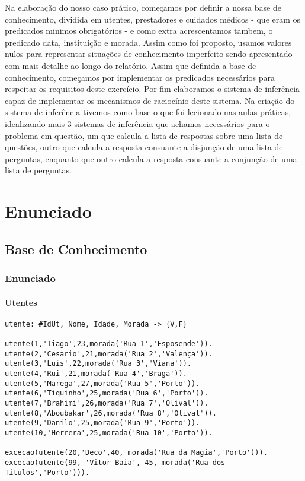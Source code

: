 \documentclass{report}
\begin{document}
Na elaboração do nosso caso prático, começamos por definir a nossa base de conhecimento, dividida em utentes, prestadores e cuidados médicos - que eram os predicados minimos obrigatórios - e como extra acrescentamos tambem, o predicado data, instituição e morada. Assim como foi proposto, usamos valores nulos para representar situações de conhecimento imperfeito sendo apresentado com mais detalhe ao longo do relatório. Assim que definida a base de conhecimento, começamos por implementar os predicados necessários para respeitar os requisitos deste exercício. Por fim elaboramos o sistema de inferência capaz de implementar os mecanismos de raciocínio deste sistema. Na criação do sistema de inferência tivemos como base o que foi lecionado nas aulas práticas, idealizando mais 3 sistemas de inferência que achamos necessários para o problema em questão, um que calcula a lista de respostas sobre uma lista de questões, outro que calcula a resposta consuante a disjunção de uma lista de perguntas, enquanto que outro calcula a resposta consuante a conjunção de uma lista de perguntas.
























\chapter{Enunciado}








\section{Base de Conhecimento}
\subsection{Enunciado}
\subsubsection{Utentes}
\begin{verbatim}
utente: #IdUt, Nome, Idade, Morada -> {V,F}

utente(1,'Tiago',23,morada('Rua 1','Esposende')).
utente(2,'Cesario',21,morada('Rua 2','Valença')).
utente(3,'Luis',22,morada('Rua 3','Viana')).
utente(4,'Rui',21,morada('Rua 4','Braga')).
utente(5,'Marega',27,morada('Rua 5','Porto')).
utente(6,'Tiquinho',25,morada('Rua 6','Porto')).
utente(7,'Brahimi',26,morada('Rua 7','Olival')).
utente(8,'Aboubakar',26,morada('Rua 8','Olival')).
utente(9,'Danilo',25,morada('Rua 9','Porto')).
utente(10,'Herrera',25,morada('Rua 10','Porto')).

excecao(utente(20,'Deco',40, morada('Rua da Magia','Porto'))).
excecao(utente(99, 'Vitor Baia', 45, morada('Rua dos Titulos','Porto'))).
\end{verbatim}
\end{document}
